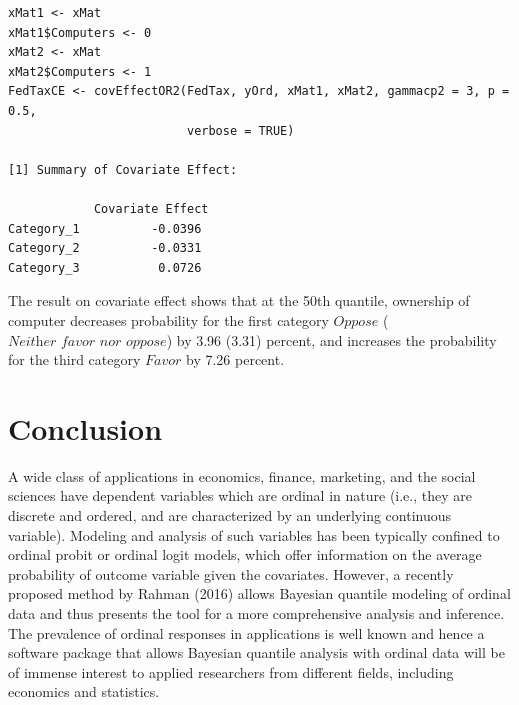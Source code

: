 \begin{verbatim}
xMat1 <- xMat
xMat1$Computers <- 0
xMat2 <- xMat
xMat2$Computers <- 1
FedTaxCE <- covEffectOR2(FedTax, yOrd, xMat1, xMat2, gammacp2 = 3, p = 0.5,
                         verbose = TRUE)

[1] Summary of Covariate Effect:

            Covariate Effect
Category_1          -0.0396
Category_2          -0.0331
Category_3           0.0726
\end{verbatim}

The result on covariate effect shows that at the 50th quantile, ownership of computer decreases probability for the first category \(\textit{Oppose}\) (\(\textit{Neither favor nor oppose}\)) by 3.96 (3.31) percent, and increases the probability for the third category \(\textit{Favor}\) by 7.26 percent.

\hypertarget{conclusion}{%
\section{Conclusion}\label{conclusion}}

A wide class of applications in economics, finance, marketing, and the social sciences have dependent variables which are ordinal in nature (i.e., they are discrete and ordered, and are characterized by an underlying continuous variable). Modeling and analysis of such variables has been typically confined to ordinal probit or ordinal logit models, which offer information on the average probability of outcome variable given the covariates. However, a recently proposed method by Rahman (2016) allows Bayesian quantile modeling of ordinal data and thus presents the tool for a more comprehensive analysis and inference. The prevalence of ordinal responses in applications is well known and hence a software package that allows Bayesian quantile analysis with ordinal data will be of immense interest to applied researchers from different fields, including economics and statistics.

